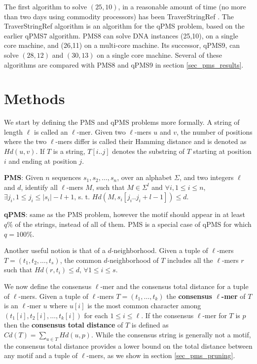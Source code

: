 The first algorithm to solve $(25,10)$, in a reasonable amount of time (no more
than two days using commodity processors) has been TraverStringRef \cite{T14}. The TraverStringRef
algorithm \cite{T14} is an algorithm for the qPMS problem, based on the earlier
qPMS7 \cite{DRD12} algorithm. PMS8 can solve DNA instances (25,10), on a single core
machine, and (26,11) on a multi-core machine. Its successor, qPMS9,
can solve $(28,12)$ and $(30,13)$ on a single core machine. 
Several of these algorithms are compared with PMS8
and qPMS9 in section \ref{sec_pms_results}.

 

\section{Methods}

We start by defining the PMS and qPMS problems more formally. A string of
length $\ell$ is called an $\ell$-mer. Given two $\ell$-mers $u$ and $v$, the
number of positions where the two $\ell$-mers differ is called their Hamming
distance and is denoted as $Hd(u,v)$. 
If $T$ is a string,  $T[i..j]$ denotes the substring of $T$ starting at
position $i$ and ending at position $j$.

\begin{problem}
{\bf PMS}: Given $n$ sequences $s_1, s_2, \ldots, s_n$,
over an alphabet $\Sigma$, and two integers $\ell$ and $d$, identify all
$\ell$-mers $M$, such that $M \in \Sigma^l$ and $\forall i,1\leq i\leq
n$, $\exists j_i, 1\leq j_i\leq |s_i|-l+1$, s. t.
$Hd(M,s_i[j_i..j_i+l-1])\leq d$.
\end{problem}

\begin{problem}
{\bf qPMS}: same as the PMS problem, however the motif should
appear in at least $q\%$ of the strings, instead of all of them. PMS is a special case of qPMS for which $q=100\%$.
\end{problem}

Another useful notion is that of a $d$-neighborhood. Given a
tuple of $\ell$-mers $T=(t_1,t_2,\ldots,t_s)$, the common $d$-neighborhood of
$T$ includes all the $\ell$-mers $r$ such that $Hd(r,t_i)\leq d$,
$\forall 1\leq i\leq s$.

We now define the consensus $\ell$-mer and the
consensus total distance for a tuple of $\ell$-mers. Given a tuple of
$\ell$-mers $T=(t_1, \ldots, t_k)$ the {\bf consensus $\ell$-mer}
of $T$ is an $\ell$-mer $u$ where $u[i]$ is the most common character among
$(t_1[i], t_2[i], \ldots, t_k[i])$ for each $1\leq i \leq \ell$. If the
consensus $\ell$-mer for $T$ is $p$ then the {\bf consensus total distance} of
$T$ is defined as $Cd(T)=\sum_{u\in T}Hd(u,p)$. While the consensus string is generally not a motif, the
consensus total distance provides a lower bound on the total distance between
any motif and a tuple of $\ell$-mers, as we show in section
\ref{sec_pms_pruning}.

